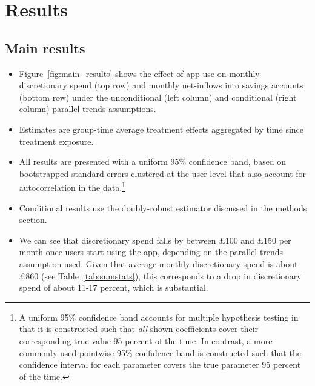 
\section{Results}%
\label{sec:results}


\subsection{Main results}%
\label{sub:main_results}

\begin{itemize}

    \item Figure~\ref{fig:main_results} shows the effect of app use on monthly
        discretionary spend (top row) and monthly net-inflows into savings
        accounts (bottom row) under the unconditional (left column) and
        conditional (right column) parallel trends assumptions.

    \item Estimates are group-time average treatment effects aggregated by time
        since treatment exposure.

    \item All results are presented with a uniform 95\% confidence band, based
        on bootstrapped standard errors clustered at the user level that also
        account for autocorrelation in the data.\footnote{A uniform 95\%
            confidence band accounts for multiple hypothesis testing in that it
            is constructed such that \textit{all} shown coefficients cover
            their corresponding true value 95 percent of the time. In contrast,
            a more commonly used pointwise 95\% confidence band is constructed
        such that the confidence interval for each parameter covers the true
    parameter 95 percent of the time.}

    \item Conditional results use the doubly-robust estimator discussed in the
        methods section.

    \item We can see that discretionary spend falls by between \pounds100 and
        \pounds150 per month once users start using the app, depending on the
        parallel trends assumption used. Given that average
        monthly discretionary spend is about \pounds860 (see
        Table~\ref{tab:sumstats}), this corresponds to a drop in discretionary
        spend of about 11-17 percent, which is substantial.


\end{itemize}
